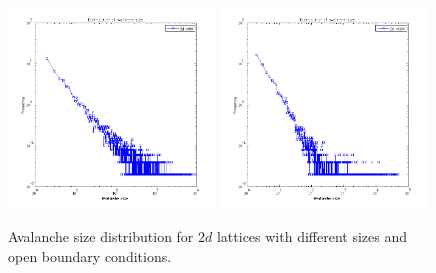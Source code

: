 \begin{figure} 
\begin{center}
\includegraphics[width=0.49\textwidth]{results/2sn50.png}
\includegraphics[width=0.49\textwidth]{results/2sn100.png} 
\caption{Avalanche size distribution for $2d$ lattices with different sizes and open boundary conditions.}
\label{sn}
\end{center}
\end{figure} 

